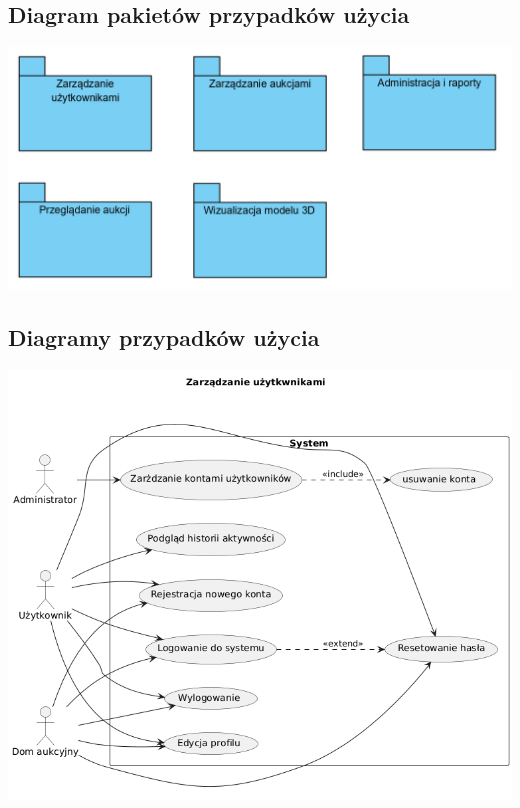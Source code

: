 \subsection{Diagram pakietów przypadków użycia}
\begin{center}
    \includegraphics[width=\linewidth]{img/schematy/Diagram pakietow.png}
    \label{fig:diagram_pakietow}
\end{center}

\subsection{Diagramy przypadków użycia}
\begin{center}
    \includegraphics[width=\linewidth]{img/schematy/zarzadzanie-uzytkownikami.png}
    \label{fig:diagram_przypadkow_uzycia}
\end{center}

